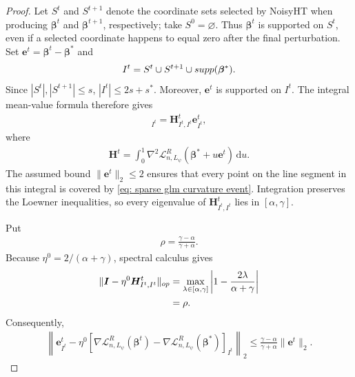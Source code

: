 \documentclass[letterpaper,12pt]{article}
\renewcommand{\d}{\mathrm{d}}
\numberwithin{equation}{section}
\theoremstyle{plain}
\numberwithin{Theorem}{section}
\numberwithin{proposition}{section}
\numberwithin{Lemma}{section}
{
	\theoremstyle{definition}
	\newtheorem{Definition}{Definition}
	\newtheorem{example}{Example}
	\numberwithin{example}{section}
	\newtheorem{fact}{Fact}
	\numberwithin{fact}{section}
	\newtheorem{remark}{Remark}
}
\newcommand{\1}{\mathbbm{1}}
\def\bbeta{{\boldsymbol{\beta}}}
\def\supp{{\rm supp}}
\def\L{{\mathcal L}}
\begin{document}
\begin{proof}
Let $S^t$ and $S^{t+1}$ denote the coordinate sets selected by NoisyHT
when producing $\bbeta^t$ and $\bbeta^{t+1}$, respectively; take
$S^0=\varnothing$.  Thus $\bbeta^t$ is supported on $S^t$, even if a
selected coordinate happens to equal zero after the final perturbation.
Set $\bm e^t=\bbeta^t-\bbeta^*$ and
\begin{align*}
    I^t=S^t\cup S^{t+1}\cup\supp(\bbeta^*).
\end{align*}
Since $|S^t|,|S^{t+1}|\leq s$,
$|I^t|\leq2s+s^*$.  Moreover, $\bm e^t$ is supported on $I^t$.
The integral mean-value formula therefore gives
\begin{align*}
    [\nabla\L_{n,L_\psi}^R(\bbeta^t)
    -\nabla\L_{n,L_\psi}^R(\bbeta^*)]_{I^t}
    =\bm H_{I^t,I^t}^t\bm e_{I^t}^t,
\end{align*}
where
\begin{align*}
    \bm H^t=\int_0^1\nabla^2\L_{n,L_\psi}^R
    (\bbeta^*+u\bm e^t)\,\d u.
\end{align*}
The assumed bound $\|\bm e^t\|_2\leq2$ ensures that every point on the
line segment in this integral is covered by
\eqref{eq: sparse glm curvature event}.  Integration preserves the
Loewner inequalities, so every eigenvalue of
$\bm H_{I^t,I^t}^t$ lies in $[\alpha,\gamma]$.

Put
\begin{align*}
    \rho=\frac{\gamma-\alpha}{\gamma+\alpha}.
\end{align*}
Because $\eta^0=2/(\alpha+\gamma)$, spectral calculus gives
\begin{align*}
\|\bm I-\eta^0\bm H_{I^t,I^t}^t\|_{\rm op}
&=\max_{\lambda\in[\alpha,\gamma]}
  \left|1-\frac{2\lambda}{\alpha+\gamma}\right|\\
&=\rho.
\end{align*}
Consequently,
\begin{align}
    \left\|
    \bm e_{I^t}^t-\eta^0
    [\nabla\L_{n,L_\psi}^R(\bbeta^t)
    -\nabla\L_{n,L_\psi}^R(\bbeta^*)]_{I^t}
    \right\|_2
    \leq \frac{\gamma-\alpha}{\gamma+\alpha}
    \|\bm e^t\|_2.                                         \label{eq: restricted gradient contraction}
\end{align}


\end{proof}
\end{document}
